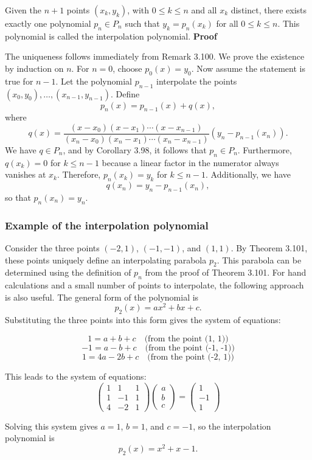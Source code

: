 Given the \(n+1\) points \((x_k, y_k)\), with \(0 \leq k \leq n\) and all \(x_k\) distinct, there exists exactly one polynomial \(p_n \in P_n\) such that \(y_k = p_n(x_k)\) for all \(0 \leq k \leq n\). This polynomial is called the interpolation polynomial.
\newline
\textbf{Proof}

The uniqueness follows immediately from Remark 3.100. We prove the existence by induction on \(n\). For \(n = 0\), choose \(p_0(x) = y_0\). 
\newline
Now assume the statement is true for \(n-1\). Let the polynomial \(p_{n-1}\) interpolate the points \((x_0, y_0), \ldots, (x_{n-1}, y_{n-1})\). Define
\[
p_n(x) = p_{n-1}(x) + q(x),
\]
where
\[
q(x) = \frac{(x - x_0)(x - x_1)\cdots(x - x_{n-1})}{(x_n - x_0)(x_n - x_1)\cdots(x_n - x_{n-1})} (y_n - p_{n-1}(x_n)).
\]
We have \(q \in P_n\), and by Corollary 3.98, it follows that \(p_n \in P_n\). Furthermore, \(q(x_k) = 0\) for \(k \leq n-1\) because a linear factor in the numerator always vanishes at \(x_k\). Therefore, \(p_n(x_k) = y_k\) for \(k \leq n-1\). Additionally, we have
\[
q(x_n) = y_n - p_{n-1}(x_n),
\]
so that \(p_n(x_n) = y_n\). 

\QED

\subsubsection*{Example of the interpolation polynomial}

Consider the three points \((-2, 1)\), \((-1, -1)\), and \((1, 1)\). By Theorem 3.101, these points uniquely define an interpolating parabola \(p_2\). This parabola can be determined using the definition of \(p_n\) from the proof of Theorem 3.101. For hand calculations and a small number of points to interpolate, the following approach is also useful. The general form of the polynomial is 
\[
p_2(x) = ax^2 + bx + c.
\]
Substituting the three points into this form gives the system of equations:

\[
1 = a + b + c \quad \text{(from the point (1, 1))}
\]
\[
-1 = a - b + c \quad \text{(from the point (-1, -1))}
\]
\[
1 = 4a - 2b + c \quad \text{(from the point (-2, 1))}
\]

This leads to the system of equations:
\[
\begin{pmatrix}
1 & 1 & 1 \\
1 & -1 & 1 \\
4 & -2 & 1
\end{pmatrix}
\begin{pmatrix}
a \\
b \\
c
\end{pmatrix}
=
\begin{pmatrix}
1 \\
-1 \\
1
\end{pmatrix}
\]

Solving this system gives \(a = 1\), \(b = 1\), and \(c = -1\), so the interpolation polynomial is
\[
p_2(x) = x^2 + x - 1.
\]


